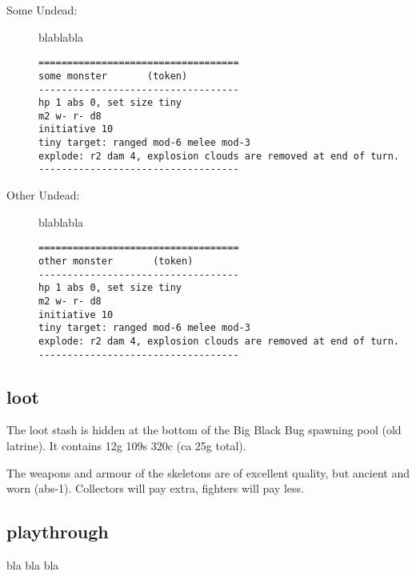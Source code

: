 \begin{description}
\item[Some Undead:] blablabla
\goodbreak \begin{samepage} \small \begin{verbatim}
===================================
some monster       (token)
-----------------------------------
hp 1 abs 0, set size tiny
m2 w- r- d8
initiative 10
tiny target: ranged mod-6 melee mod-3
explode: r2 dam 4, explosion clouds are removed at end of turn.
-----------------------------------
\end{verbatim} \normalsize \end{samepage}

\item[Other Undead:] blablabla
\goodbreak \begin{samepage} \small \begin{verbatim}
===================================
other monster       (token)
-----------------------------------
hp 1 abs 0, set size tiny
m2 w- r- d8
initiative 10
tiny target: ranged mod-6 melee mod-3
explode: r2 dam 4, explosion clouds are removed at end of turn.
-----------------------------------
\end{verbatim} \normalsize \end{samepage}
\end{description}


\subsection*{loot}

The loot stash is hidden at the bottom of the Big Black Bug spawning pool (old latrine). It contains 12g 109s 320c (ca 25g total).

The weapons and armour of the skeletons are of excellent quality, but ancient and worn (abs-1). Collectors will pay extra, fighters will pay less.


\subsection*{playthrough}

bla bla bla







\newpage
